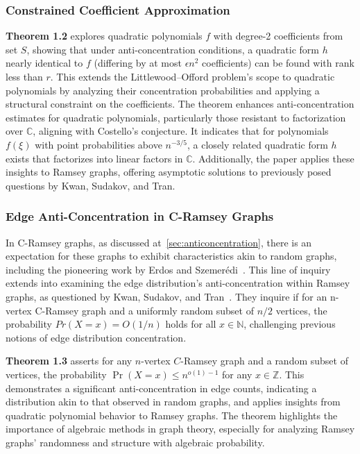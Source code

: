 
\subsubsection{Constrained Coefficient Approximation}
\textbf{Theorem 1.2} explores quadratic polynomials ${f}$ with degree-2 coefficients 
from set $S$, showing that under anti-concentration conditions, a quadratic form $h$ 
nearly identical to ${f}$ (differing by at most $\epsilon n^2$ coefficients) can be 
found with rank less than $r$. This extends the Littlewood–Offord problem's scope to quadratic polynomials by analyzing their concentration probabilities and applying a structural constraint on the coefficients. The theorem enhances anti-concentration estimates for quadratic polynomials, particularly those resistant to factorization over $\mathbb{C}$, aligning with Costello's conjecture. It indicates that for polynomials $f(\xi)$ with point probabilities above $n^{-3/5}$, a closely related quadratic form $h$ exists that factorizes into linear factors in $\mathbb{C}$. Additionally, the paper applies these insights to Ramsey graphs, offering asymptotic solutions to previously posed questions by Kwan, Sudakov, and Tran.


\subsubsection{Edge Anti-Concentration in C-Ramsey Graphs}
In C-Ramsey graphs, as discussed at~\ref{sec:anticoncentration}, 
there is an expectation for these graphs to exhibit characteristics akin to random graphs,
including the pioneering work by Erdos and Szemerédi~\cite{erdHos1972ramsey}.
This line of inquiry extends into examining the edge distribution's anti-concentration
within Ramsey graphs, as questioned by Kwan, Sudakov, and Tran~\cite{kwan2019anticoncentration}.
They inquire if for an n-vertex C-Ramsey graph and a uniformly random subset of
$n/2$ vertices, the probability $Pr(X=x)=O(1/n)$ holds for all $x \in \mathbb{N}$,
challenging previous notions of edge distribution concentration.

\textbf{Theorem 1.3} asserts for any $n$-vertex $C$-Ramsey graph and a random subset of vertices, the probability $\Pr(X = x) \leq n^{o(1)-1}$ for any $x \in \mathbb{Z}$. This demonstrates a significant anti-concentration in edge counts, indicating a distribution akin to that observed in random graphs, and applies insights from quadratic polynomial behavior to Ramsey graphs.
The theorem highlights the importance of algebraic methods in graph theory,
especially for analyzing Ramsey graphs' randomness and structure with algebraic probability.

